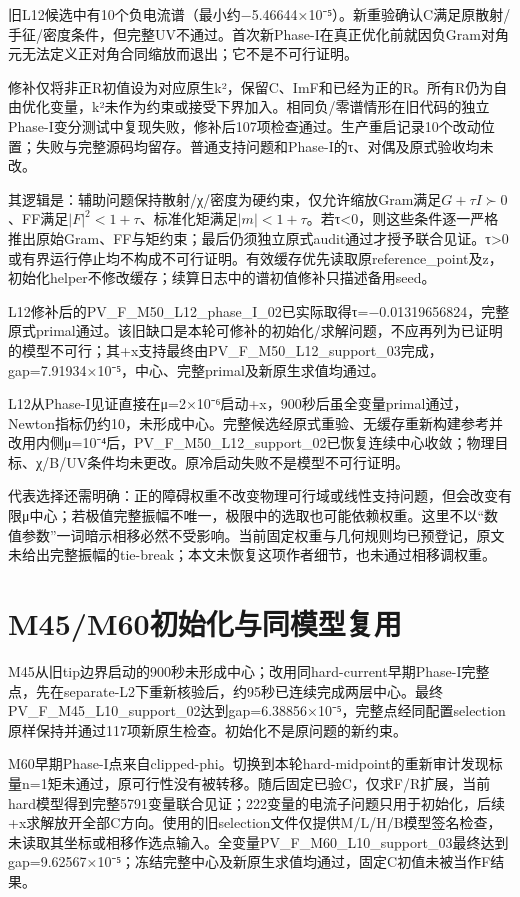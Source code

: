 \documentclass[
  10pt,
  a4paper,
]{article}
\begin{document}
旧L12候选中有10个负电流谱（最小约−5.46644×10⁻⁵）。新重验确认C满足原散射/手征/密度条件，但完整UV不通过。首次新Phase-I在真正优化前就因负Gram对角元无法定义正对角合同缩放而退出；它不是不可行证明。

修补仅将非正R初值设为对应原生k²，保留C、ImF和已经为正的R。所有R仍为自由优化变量，k²未作为约束或接受下界加入。相同负/零谱情形在旧代码的独立Phase-I变分测试中复现失败，修补后107项检查通过。生产重启记录10个改动位置；失败与完整源码均留存。普通支持问题和Phase-I的τ、对偶及原式验收均未改。

其逻辑是：辅助问题保持散射/χ/密度为硬约束，仅允许缩放Gram满足\(G+\tau I\succ0\)、FF满足\(|F|^2<1+\tau\)、标准化矩满足\(|m|<1+\tau\)。若τ\textless0，则这些条件逐一严格推出原始Gram、FF与矩约束；最后仍须独立原式audit通过才授予联合见证。τ\textgreater0或有界运行停止均不构成不可行证明。有效缓存优先读取原reference\_point及z，初始化helper不修改缓存；续算日志中的谱初值修补只描述备用seed。

L12修补后的PV\_F\_M50\_L12\_phase\_I\_02已实际取得τ=−0.01319656824，完整原式primal通过。该旧缺口是本轮可修补的初始化/求解问题，不应再列为已证明的模型不可行；其+x支持最终由PV\_F\_M50\_L12\_support\_03完成，gap=7.91934×10⁻⁵，中心、完整primal及新原生求值均通过。

L12从Phase-I见证直接在μ=2×10⁻⁶启动+x，900秒后虽全变量primal通过，Newton指标仍约10，未形成中心。完整候选经原式重验、无缓存重新构建参考并改用内侧μ=10⁻⁴后，PV\_F\_M50\_L12\_support\_02已恢复连续中心收敛；物理目标、χ/B/UV条件均未更改。原冷启动失败不是模型不可行证明。

代表选择还需明确：正的障碍权重不改变物理可行域或线性支持问题，但会改变有限μ中心；若极值完整振幅不唯一，极限中的选取也可能依赖权重。这里不以``数值参数''一词暗示相移必然不受影响。当前固定权重与几何规则均已预登记，原文未给出完整振幅的tie-break；本文未恢复这项作者细节，也未通过相移调权重。

\section{M45/M60初始化与同模型复用}\label{m45m60ux521dux59cbux5316ux4e0eux540cux6a21ux578bux590dux7528}

M45从旧tip边界启动的900秒未形成中心；改用同hard-current早期Phase-I完整点，先在separate-L2下重新核验后，约95秒已连续完成两层中心。最终PV\_F\_M45\_L10\_support\_02达到gap=6.38856×10⁻⁵，完整点经同配置selection原样保持并通过117项新原生检查。初始化不是原问题的新约束。

M60早期Phase-I点来自clipped-phi。切换到本轮hard-midpoint的重新审计发现标量n=1矩未通过，原可行性没有被转移。随后固定已验C，仅求F/R扩展，当前hard模型得到完整5791变量联合见证；222变量的电流子问题只用于初始化，后续+x求解放开全部C方向。使用的旧selection文件仅提供M/L/H/B模型签名检查，未读取其坐标或相移作选点输入。全变量PV\_F\_M60\_L10\_support\_03最终达到gap=9.62567×10⁻⁵；冻结完整中心及新原生求值均通过，固定C初值未被当作F结果。
\end{document}
